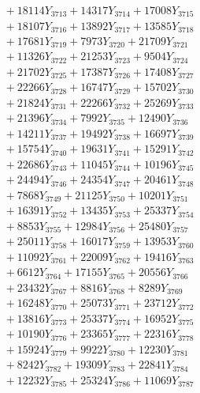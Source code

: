 \documentclass[a4paper,10pt]{article}
\begin{document}
{\begin{align}
&\;  + 18114 Y_{3713} + 14317 Y_{3714} + 17008 Y_{3715} \\[0.3ex]
&\;  + 18107 Y_{3716} + 13892 Y_{3717} + 13585 Y_{3718} \\[0.5ex]\allowbreak
&\;  + 17681 Y_{3719} + 7973 Y_{3720} + 21709 Y_{3721} \\[0.3ex]
&\;  + 11326 Y_{3722} + 21253 Y_{3723} + 9504 Y_{3724} \\[0.3ex]
&\;  + 21702 Y_{3725} + 17387 Y_{3726} + 17408 Y_{3727} \\[0.3ex]
&\;  + 22266 Y_{3728} + 16747 Y_{3729} + 15702 Y_{3730} \\[0.3ex]
&\;  + 21824 Y_{3731} + 22266 Y_{3732} + 25269 Y_{3733} \\[0.3ex]
&\;  + 21396 Y_{3734} + 7992 Y_{3735} + 12490 Y_{3736} \\[0.3ex]
&\;  + 14211 Y_{3737} + 19492 Y_{3738} + 16697 Y_{3739} \\[0.3ex]
&\;  + 15754 Y_{3740} + 19631 Y_{3741} + 15291 Y_{3742} \\[0.3ex]
&\;  + 22686 Y_{3743} + 11045 Y_{3744} + 10196 Y_{3745} \\[0.3ex]
&\;  + 24494 Y_{3746} + 24354 Y_{3747} + 20461 Y_{3748} \\[0.5ex]\allowbreak
&\;  + 7868 Y_{3749} + 21125 Y_{3750} + 10201 Y_{3751} \\[0.3ex]
&\;  + 16391 Y_{3752} + 13435 Y_{3753} + 25337 Y_{3754} \\[0.3ex]
&\;  + 8853 Y_{3755} + 12984 Y_{3756} + 25480 Y_{3757} \\[0.3ex]
&\;  + 25011 Y_{3758} + 16017 Y_{3759} + 13953 Y_{3760} \\[0.3ex]
&\;  + 11092 Y_{3761} + 22009 Y_{3762} + 19416 Y_{3763} \\[0.3ex]
&\;  + 6612 Y_{3764} + 17155 Y_{3765} + 20556 Y_{3766} \\[0.3ex]
&\;  + 23432 Y_{3767} + 8816 Y_{3768} + 8289 Y_{3769} \\[0.3ex]
&\;  + 16248 Y_{3770} + 25073 Y_{3771} + 23712 Y_{3772} \\[0.3ex]
&\;  + 13816 Y_{3773} + 25337 Y_{3774} + 16952 Y_{3775} \\[0.3ex]
&\;  + 10190 Y_{3776} + 23365 Y_{3777} + 22316 Y_{3778} \\[0.5ex]\allowbreak
&\;  + 15924 Y_{3779} + 9922 Y_{3780} + 12230 Y_{3781} \\[0.3ex]
&\;  + 8242 Y_{3782} + 19309 Y_{3783} + 22841 Y_{3784} \\[0.3ex]
&\;  + 12232 Y_{3785} + 25324 Y_{3786} + 11069 Y_{3787} \\[0.3ex]

\end{align}}
\end{document}
